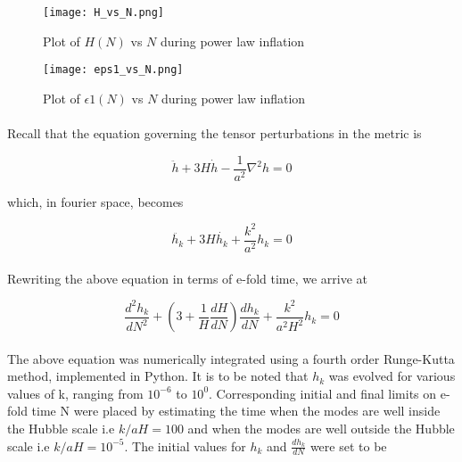 \documentclass[12pt,a4paper,oneside]{book}
\begin{document}
\begin{figure}
\begin{center}
\texttt{[image: H\_vs\_N.png]}
\caption[Plot of $H(N)$ vs $N$ during power law inflation]{Plot of $H(N)$ vs $N$ during power law inflation}
\label{blah}
\end{center}
\end{figure}

\begin{figure}
\begin{center}
\texttt{[image: eps1\_vs\_N.png]}
\caption[Plot of $\epsilon 1(N)$ vs $N$ during power law inflation]{Plot of $\epsilon 1(N)$ vs $N$ during power law inflation}
\label{blah}
\end{center}
\end{figure}

\paragraph*{} Recall that the equation governing the tensor perturbations in the metric is

\begin{equation}
\ddot{h} + 3H\dot{h} - \frac{1}{a^2}\nabla ^2h = 0
\end{equation}

\noindent which, in fourier space, becomes

\begin{equation}
\ddot{h_k} + 3H\dot{h_k} + \frac{k^2}{a^2}h_k = 0
\end{equation}

\paragraph*{} Rewriting the above equation in terms of e-fold time, we arrive at

\begin{equation}
\frac{d^2h_k}{dN^2} + (3+\frac{1}{H}\frac{dH}{dN})\frac{dh_k}{dN} + \frac{k^2}{a^2H^2}h_k = 0
\end{equation}

\paragraph*{} The above equation was numerically integrated using a fourth order Runge-Kutta method, implemented in Python. It is to be noted that $h_k$ was evolved for various values of k, ranging from $10^{-6}$ to $10^{0}$. Corresponding initial and final limits on e-fold time N were placed by estimating the time when the modes are well inside the Hubble scale i.e $k/aH =  100$ and when the modes are well outside the Hubble scale i.e $k/aH =  10^{-5}$. The initial values for $h_k$ and $\frac{dh_k}{dN}$ were set to be
\end{document}
